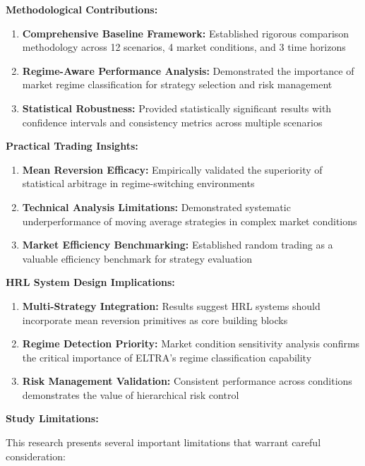 \documentclass[11pt,a4paper]{article}
\begin{document}
\textbf{Methodological Contributions:}
\begin{enumerate}
\item \textbf{Comprehensive Baseline Framework:} Established rigorous comparison methodology across 12 scenarios, 4 market conditions, and 3 time horizons
\item \textbf{Regime-Aware Performance Analysis:} Demonstrated the importance of market regime classification for strategy selection and risk management
\item \textbf{Statistical Robustness:} Provided statistically significant results with confidence intervals and consistency metrics across multiple scenarios

\end{enumerate}
\textbf{Practical Trading Insights:}
\begin{enumerate}
\item \textbf{Mean Reversion Efficacy:} Empirically validated the superiority of statistical arbitrage in regime-switching environments
\item \textbf{Technical Analysis Limitations:} Demonstrated systematic underperformance of moving average strategies in complex market conditions
\item \textbf{Market Efficiency Benchmarking:} Established random trading as a valuable efficiency benchmark for strategy evaluation

\end{enumerate}
\textbf{HRL System Design Implications:}
\begin{enumerate}
\item \textbf{Multi-Strategy Integration:} Results suggest HRL systems should incorporate mean reversion primitives as core building blocks
\item \textbf{Regime Detection Priority:} Market condition sensitivity analysis confirms the critical importance of ELTRA's regime classification capability
\item \textbf{Risk Management Validation:} Consistent performance across conditions demonstrates the value of hierarchical risk control

\end{enumerate}
\textbf{Study Limitations:}

This research presents several important limitations that warrant careful consideration:
\end{document}
